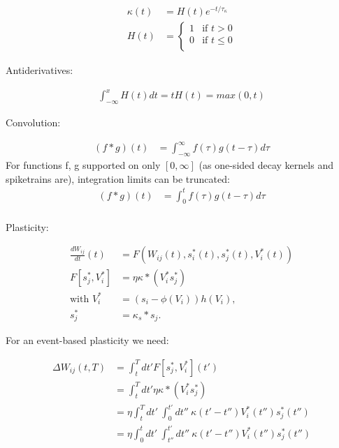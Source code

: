 \begin{align}
  \kappa(t) & = H(t)e^{-t/\tau_{\kappa}} \\
  H(t)      & =
  \begin{cases}
    1 & \text{if $t > 0$}    \\
    0 & \text{if $t \leq 0$} \\
  \end{cases}
\end{align}

Antiderivatives:

\begin{align}
  \int_{-\infty}^x H(t)dt = tH(t) = max(0,t)
\end{align}

Convolution:

\begin{align}
  (f \ast g)(t) & = \int_{- \infty }^{\infty} f(\tau) g(t-\tau) d \tau
\end{align}
For functions f, g supported on only $[0, \infty]$ (as one-sided decay kernels and spiketrains are), integration limits
can be truncated:
\begin{align}
  (f \ast g)(t) & = \int_{0}^{t} f(\tau) g(t-\tau) d \tau \\
\end{align}


Plasticity:

\begin{align}
  \frac{dW_{ij}}{dt}(t) & = F(W_{ij}(t), s_i^\ast (t), s_j^\ast (t), V_i^\ast (t)) \\
  F[s_j^\ast, V_i^\ast] & = \eta \kappa \ast (V_i^\ast s_j^\ast)                   \\
  \text{with } V_i^\ast & = (s_i - \phi(V_i )) h(V_i),                             \\
  s_j^\ast              & = \kappa_s \ast s_j.
\end{align}

For an event-based plasticity we need:

\begin{align}
  \Delta W_{ij}(t,T) & = \int_t^T dt' F[s_j^\ast , V_i^\ast ](t')                                                 \\
                     & = \int_t^T dt' \eta \kappa \ast (V_i^\ast s_j^\ast)                                        \\
                     & = \eta \int_t^T dt' \  \int_0^{t'} dt'' \ \kappa(t'-t'') V_i^\ast (t'') s_j^\ast (t'')     \\
                     & = \eta \int_0^t dt' \  \int_{t''}^{t'} dt'' \ \kappa(t'-t'') V_i^\ast (t'') s_j^\ast (t'') \\
\end{align}


